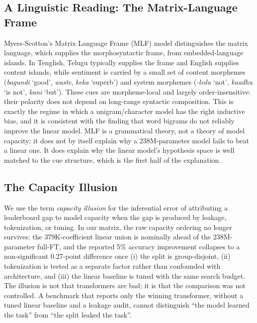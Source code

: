 \documentclass[10pt,journal]{IEEEtran}
\begin{document}
\subsection{A Linguistic Reading: The Matrix-Language Frame}
Myers-Scotton's Matrix Language Frame (MLF) model \cite{myersscotton2002} distinguishes the matrix language, which supplies the morphosyntactic frame, from embedded-language islands. In Tenglish, Telugu typically supplies the frame and English supplies content islands, while sentiment is carried by a small set of content morphemes (\textit{bagundi} `good', \textit{waste}, \textit{keka} `superb') and system morphemes (\textit{-ledu} `not', \textit{kaadhu} `is not', \textit{kani} `but'). These cues are morpheme-local and largely order-insensitive: their polarity does not depend on long-range syntactic composition. This is exactly the regime in which a unigram/character model has the right inductive bias, and it is consistent with the finding that word bigrams do not reliably improve the linear model. MLF is a grammatical theory, not a theory of model capacity; it does not by itself explain why a 238M-parameter model fails to beat a linear one. It does explain why the linear model's hypothesis space is well matched to the cue structure, which is the first half of the explanation.

\subsection{The Capacity Illusion}
We use the term \emph{capacity illusion} for the inferential error of attributing a leaderboard gap to model capacity when the gap is produced by leakage, tokenization, or tuning. In our matrix, the raw capacity ordering no longer survives: the 379K-coefficient linear union is nominally ahead of the 238M-parameter full-FT, and the reported 5\% accuracy improvement collapses to a non-significant 0.27-point difference once (i) the split is group-disjoint, (ii) tokenization is tested as a separate factor rather than confounded with architecture, and (iii) the linear baseline is tuned with the same search budget. The illusion is not that transformers are bad; it is that the comparison was not controlled. A benchmark that reports only the winning transformer, without a tuned linear baseline and a leakage audit, cannot distinguish ``the model learned the task'' from ``the split leaked the task''.
\end{document}
